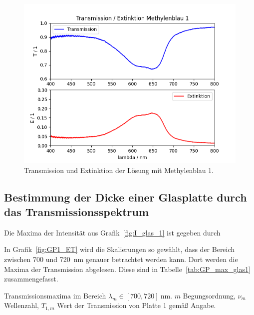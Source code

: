 \documentclass{article}
\begin{document}
\begin{figure}[H]
\centering
\caption{Transmission und Extinktion der Lösung mit Methylenblau 1.}
\label{fig:MB_ET_1}
\includegraphics[scale=0.7]{MB_ET_1.png}
\end{figure}





\subsection{Bestimmung der Dicke einer Glasplatte durch das Transmissionsspektrum}

Die Maxima der Intensität aus Grafik~\ref{fig:I_glas_1} ist gegeben durch

In Grafik~\ref{fig:GP1_ET} wird die Skalierungen so gewählt, dass der Bereich zwischen 700 und 720~nm genauer betrachtet werden kann. Dort werden die Maxima der Transmission abgelesen. Diese sind in Tabelle~\ref{tab:GP_max_glas1} zusammengefasst.

\begin{table}[H]
\centering
\caption{Transmissionsmaxima im Bereich $\lambda_m\in[700,720]~$nm. $m$ Begungsordnung, $\nu_m$ Wellenzahl, $T_{1,m}$ Wert der Transmission von Platte 1 gemäß Angabe.}
\label{tab:GP_max_glas1}

\end{table}


%
\end{document}
